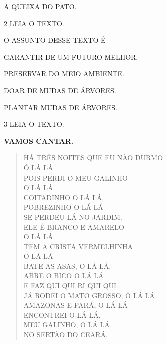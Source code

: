 \begin{escola}
\begin{escolha}
\item A QUEIXA DO PATO.
\end{escolha}


\num{2} LEIA O TEXTO.



O ASSUNTO DESSE TEXTO É

\begin{escolha}
\item GARANTIR DE UM FUTURO MELHOR.

\item PRESERVAR DO MEIO AMBIENTE.

\item DOAR DE MUDAS DE ÁRVORES.

\item PLANTAR MUDAS DE ÁRVORES.
\end{escolha}


\num{3} LEIA O TEXTO.

\textbf{VAMOS CANTAR.}

\begin{verse}
HÁ TRÊS NOITES QUE EU NÃO DURMO\\
Ó LÁ LÁ\\
POIS PERDI O MEU GALINHO\\
O LÁ LÁ\\
COITADINHO O LÁ LÁ,\\
POBREZINHO O LÁ LÁ\\
SE PERDEU LÁ NO JARDIM.\\
ELE É BRANCO E AMARELO\\
O LÁ LÁ\\
TEM A CRISTA VERMELHINHA\\
O LÁ LÁ\\
BATE AS ASAS, O LÁ LÁ,\\
ABRE O BICO O LÁ LÁ\\
E FAZ QUI QUI RI QUI QUI\\
JÁ RODEI O MATO GROSSO, Ó LÁ LÁ\\
AMAZONAS E PARÁ, O LÁ LÁ\\
ENCONTREI O LÁ LÁ,\\
MEU GALINHO, O LÁ LÁ\\
NO SERTÃO DO CEARÁ.
\end{verse}


\end{escola}
